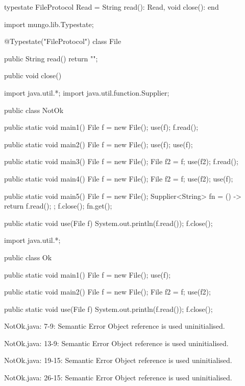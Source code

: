 \begin{code}
typestate FileProtocol {
  Read = {
    String read(): Read,
    void close(): end
  }
}\end{code}

\begin{code}
import mungo.lib.Typestate;

@Typestate("FileProtocol")
class File {

  public String read() {
    return "";
  }

  public void close() {
  }

}\end{code}

\begin{code}
import java.util.*;
import java.util.function.Supplier;

public class NotOk {
  public static void main1() {
    File f = new File();
    use(f);
    f.read();
  }

  public static void main2() {
    File f = new File();
    use(f);
    use(f);
  }

  public static void main3() {
    File f = new File();
    File f2 = f;
    use(f2);
    f.read();
  }

  public static void main4() {
    File f = new File();
    File f2 = f;
    use(f2);
    use(f);
  }

  public static void main5() {
    File f = new File();
    Supplier<String> fn = () -> {
      return f.read();
    };
    f.close();
    fn.get();
  }

  public static void use(File f) {
    System.out.println(f.read());
    f.close();
  }
}\end{code}

\begin{code}
import java.util.*;

public class Ok {
  public static void main1() {
    File f = new File();
    use(f);
  }

  public static void main2() {
    File f = new File();
    File f2 = f;
    use(f2);
  }

  public static void use(File f) {
    System.out.println(f.read());
    f.close();
  }
}\end{code}

\lstset{language=,caption=Original Mungo output}
\begin{code}

NotOk.java: 7-9: Semantic Error
		Object reference is used uninitialised.

NotOk.java: 13-9: Semantic Error
		Object reference is used uninitialised.

NotOk.java: 19-15: Semantic Error
		Object reference is used uninitialised.

NotOk.java: 26-15: Semantic Error
		Object reference is used uninitialised.
\end{code}

